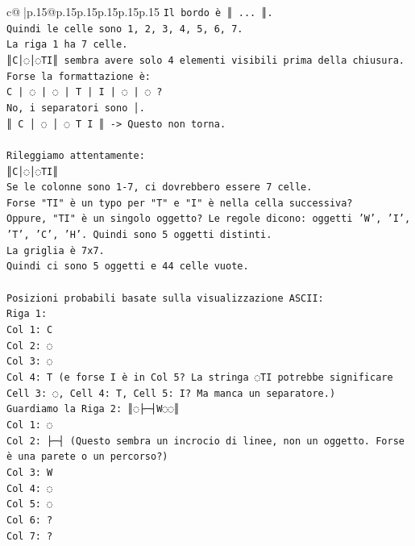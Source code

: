 \documentclass{article}
\begin{document}
{\begin{supertabular}{c@{$\;$}|p{.15\linewidth}@{}p{.15\linewidth}p{.15\linewidth}p{.15\linewidth}p{.15\linewidth}p{.15\linewidth}}
{{{\texttt{Il bordo è ║ ... ║.} \\
\texttt{Quindi le celle sono 1, 2, 3, 4, 5, 6, 7.} \\
\texttt{La riga 1 ha 7 celle.} \\
\texttt{║C│◌│◌TI║ sembra avere solo 4 elementi visibili prima della chiusura.} \\
\texttt{Forse la formattazione è:} \\
\texttt{C | ◌ | ◌ | T | I | ◌ | ◌ ?} \\
\texttt{No, i separatori sono │.} \\
\texttt{║ C │ ◌ │ ◌ T I ║ {-}> Questo non torna.} \\
\\ 
\texttt{Rileggiamo attentamente:} \\
\texttt{║C│◌│◌TI║} \\
\texttt{Se le colonne sono 1{-}7, ci dovrebbero essere 7 celle.} \\
\texttt{Forse "TI" è un typo per "T" e "I" è nella cella successiva?} \\
\texttt{Oppure, "TI" è un singolo oggetto? Le regole dicono: oggetti 'W', 'I', 'T', 'C', 'H'. Quindi sono 5 oggetti distinti.} \\
\texttt{La griglia è 7x7.} \\
\texttt{Quindi ci sono 5 oggetti e 44 celle vuote.} \\
\\ 
\texttt{Posizioni probabili basate sulla visualizzazione ASCII:} \\
\texttt{Riga 1:} \\
\texttt{Col 1: C} \\
\texttt{Col 2: ◌} \\
\texttt{Col 3: ◌} \\
\texttt{Col 4: T (e forse I è in Col 5? La stringa ◌TI potrebbe significare Cell 3: ◌, Cell 4: T, Cell 5: I? Ma manca un separatore.)} \\
\texttt{Guardiamo la Riga 2: ║◌├─┤W◌◌║} \\
\texttt{Col 1: ◌} \\
\texttt{Col 2: ├─┤ (Questo sembra un incrocio di linee, non un oggetto. Forse è una parete o un percorso?)} \\
\texttt{Col 3: W} \\
\texttt{Col 4: ◌} \\
\texttt{Col 5: ◌} \\
\texttt{Col 6: ?} \\
\texttt{Col 7: ?} \\
}}}
\end{supertabular}}
\end{document}
